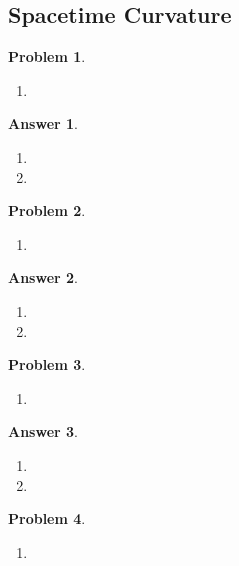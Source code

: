 \documentclass[a4paper]{article}
\newtheorem{ans}{Answer}[subsection]
\theoremstyle{new}
\newtheorem{qns}{Problem}[section]
\begin{document}
\subsection*{Spacetime Curvature}
\begin{qns}\leavevmode
\begin{enumerate}[label=(\alph*)]
\item 

\end{enumerate}
\end{qns}
\begin{ans}\leavevmode
\begin{enumerate}[label=(\alph*)]
\item

\item 
\end{enumerate}
\end{ans}
\begin{qns}\leavevmode
\begin{enumerate}[label=(\alph*)]
\item 

\end{enumerate}
\end{qns}
\begin{ans}\leavevmode
\begin{enumerate}[label=(\alph*)]
\item

\item 
\end{enumerate}
\end{ans}
\newpage
\begin{qns}\leavevmode
\begin{enumerate}[label=(\alph*)]
\item 

\end{enumerate}
\end{qns}
\begin{ans}\leavevmode
\begin{enumerate}[label=(\alph*)]
\item

\item 
\end{enumerate}
\end{ans}
\begin{qns}\leavevmode
\begin{enumerate}[label=(\alph*)]
\item 

\end{enumerate}
\end{qns}
\end{document}
